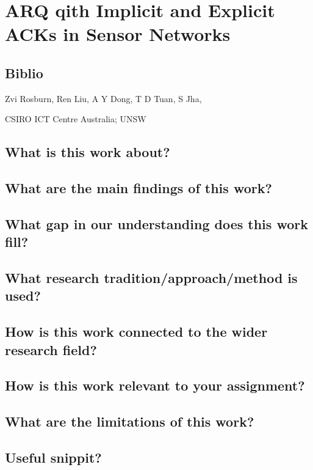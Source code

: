 \documentclass[a4paper]{report}
\begin{document}
\section{ ARQ qith Implicit and Explicit ACKs in Sensor Networks\cite{Rosberg2008}}
\subsection{Biblio}
Zvi Rosburn, Ren Liu, A Y Dong, T D Tuan, S Jha,

CSIRO ICT Centre Australia; UNSW
\subsection{What is this work about?}
\subsection{What are the main findings of this work?}
\subsection{What gap in our understanding does this work fill?}
\subsection{What research tradition/approach/method is used?}
\subsection{How is this work connected to the wider research field?}
\subsection{How is this work relevant to your assignment?}
\subsection{What are the limitations of this work?}
\subsection{Useful snippit?}
\end{document}
